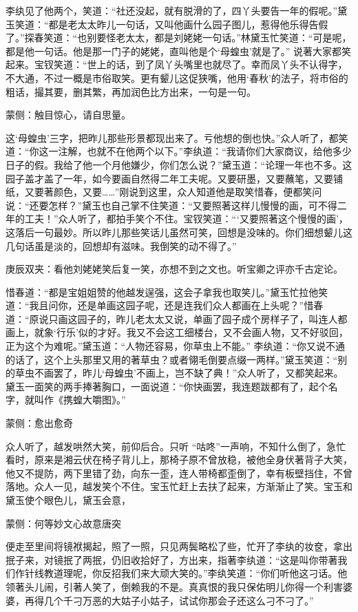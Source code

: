 \begin{parag}
    李纨见了他两个，笑道：“社还没起，就有脱滑的了，四丫头要告一年的假呢。”黛玉笑道：“都是老太太昨儿一句话，又叫他画什么园子图儿，惹得他乐得告假了。”探春笑道：“也别要怪老太太，都是刘姥姥一句话。”林黛玉忙笑道：“可是呢，都是他一句话。他是那一门子的姥姥，直叫他是个‘母蝗虫’就是了。” 说著大家都笑起来。宝钗笑道：“世上的话，到了凤丫头嘴里也就尽了。幸而凤丫头不认得字，不大通，不过一概是市俗取笑。更有颦儿这促狭嘴，他用‘春秋’的法子，将市俗的粗话，撮其要，删其繁，再加润色比方出来，一句是一句。\begin{note}蒙侧：触目惊心，请自思量。\end{note}这‘母蝗虫’三字，把昨儿那些形景都现出来了。亏他想的倒也快。”众人听了，都笑道：“你这一注解，也就不在他两个以下。”李纨道：“我请你们大家商议，给他多少日子的假。我给了他一个月他嫌少，你们怎么说？”黛玉道：“论理一年也不多。这园子盖才盖了一年，如今要画自然得二年工夫呢。又要研墨，又要蘸笔，又要铺纸，又要著颜色，又要……”刚说到这里，众人知道他是取笑惜春，便都笑问说：“还要怎样？”黛玉也自己掌不住笑道：“又要照著这样儿慢慢的画，可不得二年的工夫！”众人听了，都拍手笑个不住。宝钗笑道：“‘又要照著这个慢慢的画’，这落后一句最妙。所以昨儿那些笑话儿虽然可笑，回想是没味的。你们细想颦儿这几句话虽是淡的，回想却有滋味。我倒笑的动不得了。”\begin{note}庚辰双夹：看他刘姥姥笑后复一笑，亦想不到之文也。听宝卿之评亦千古定论。\end{note}惜春道：“都是宝姐姐赞的他越发逞强，这会子拿我也取笑儿。”黛玉忙拉他笑道：“我且问你，还是单画这园子呢，还是连我们众人都画在上头呢？”惜春道：“原说只画这园子的，昨儿老太太又说，单画了园子成个房样子了，叫连人都画上，就象‘行乐’似的才好。我又不会这工细楼台，又不会画人物，又不好驳回，正为这个为难呢。”黛玉道：“人物还容易，你草虫上不能。” 李纨道：“你又说不通的话了，这个上头那里又用的著草虫？或者翎毛倒要点缀一两样。”黛玉笑道：“别的草虫不画罢了，昨儿‘母蝗虫’不画上，岂不缺了典！”众人听了，又都笑起来。黛玉一面笑的两手捧著胸口，一面说道：“你快画罢，我连题跋都有了，起个名字，就叫作《携蝗大嚼图》。”\begin{note}蒙侧：愈出愈奇\end{note}众人听了，越发哄然大笑，前仰后合。只听 “咕咚”一声响，不知什么倒了，急忙看时，原来是湘云伏在椅子背儿上，那椅子原不曾放稳，被他全身伏著背子大笑，他又不提防，两下里错了劲，向东一歪，连人带椅都歪倒了，幸有板壁挡住，不曾落地。众人一见，越发笑个不住。宝玉忙赶上去扶了起来，方渐渐止了笑。宝玉和黛玉使个眼色儿，黛玉会意，\begin{note}蒙侧：何等妙文心故意唐突\end{note}便走至里间将镜袱揭起，照了一照，只见两鬓略松了些，忙开了李纨的妆奁，拿出抿子来，对镜抿了两抿，仍旧收拾好了，方出来，指著李纨道：“这是叫你带著我们作针线教道理呢，你反招我们来大顽大笑的。”李纨笑道：“你们听他这刁话。他领著头儿闹，引著人笑了，倒赖我的不是。真真恨的我只保佑明儿你得一个利害婆婆，再得几个千刁万恶的大姑子小姑子，试试你那会子还这么刁不刁了。”
\end{parag}


